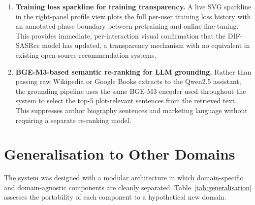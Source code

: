 \begin{enumerate}
    \item \textbf{Training loss sparkline for training transparency.}
    A live SVG sparkline in the right-panel profile view plots the full per-user training loss history with an annotated phase boundary between pretraining and online fine-tuning.
    This provides immediate, per-interaction visual confirmation that the DIF-SASRec model has updated, a transparency mechanism with no equivalent in existing open-source recommendation systems.

    \item \textbf{BGE-M3-based semantic re-ranking for LLM grounding.}
    Rather than passing raw Wikipedia or Google Books extracts to the Qwen2.5 assistant, the grounding pipeline uses the same BGE-M3 encoder used throughout the system to select the top-5 plot-relevant sentences from the retrieved text.
    This suppresses author biography sentences and marketing language without requiring a separate re-ranking model.
\end{enumerate}


\section{Generalisation to Other Domains}
\label{sec:generalisation}

The system was designed with a modular architecture in which domain-specific and domain-agnostic components are cleanly separated.
Table~\ref{tab:generalisation} assesses the portability of each component to a hypothetical new domain.

